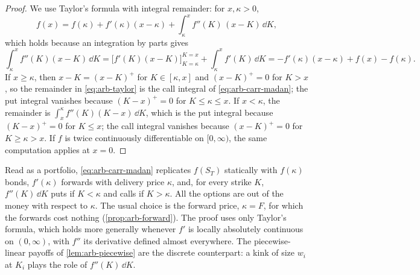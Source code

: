 \begin{proof}
We use Taylor's formula with integral remainder: for $x,\kappa>0$,
\begin{equation}\label{eq:arb-taylor}
  f(x)=f(\kappa)+f'(\kappa)(x-\kappa)+\int_\kappa^xf''(K)\,(x-K)\,\dd K ,
\end{equation}
which holds because an integration by parts gives
\[
  \int_\kappa^xf''(K)(x-K)\,\dd K=\Big[f'(K)(x-K)\Big]_{K=\kappa}^{K=x}+\int_\kappa^xf'(K)\,\dd K
  =-f'(\kappa)(x-\kappa)+f(x)-f(\kappa).
\]
If $x\ge\kappa$, then $x-K=(x-K)^+$ for $K\in[\kappa,x]$ and $(x-K)^+=0$ for $K>x$, so the
remainder in \eqref{eq:arb-taylor} is the call integral of \eqref{eq:arb-carr-madan}; the put
integral vanishes because $(K-x)^+=0$ for $K\le\kappa\le x$. If $x<\kappa$, the remainder is
$\int_x^\kappa f''(K)(K-x)\,\dd K$, which is the put integral because $(K-x)^+=0$ for $K\le x$;
the call integral vanishes because $(x-K)^+=0$ for $K\ge\kappa>x$. If $f$ is twice
continuously differentiable on $[0,\infty)$, the same computation applies at $x=0$.
\end{proof}

Read as a portfolio, \eqref{eq:arb-carr-madan} replicates $f(S_T)$ statically with
$f(\kappa)$ bonds, $f'(\kappa)$ forwards with delivery price $\kappa$, and, for every strike
$K$, $f''(K)\,\dd K$ puts if $K<\kappa$ and calls if $K>\kappa$. All the options are out of
the money with respect to $\kappa$. The usual choice is the forward price, $\kappa=F$, for
which the forwards cost nothing (\cref{prop:arb-forward}). The proof uses only Taylor's
formula, which holds more generally whenever $f'$ is locally absolutely continuous on
$(0,\infty)$, with $f''$ its derivative defined almost everywhere. The piecewise-linear payoffs of
\cref{lem:arb-piecewise} are the discrete counterpart: a kink of size $w_i$ at $K_i$ plays the
role of $f''(K)\,\dd K$.

